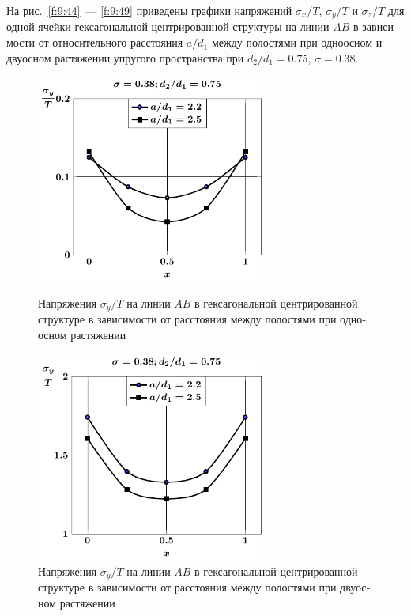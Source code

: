 \begin{russian}
На рис.~\ref{f:9:44}~--- \ref{f:9:49} приведены графики напряжений $\sigma_x/T$, $\sigma_y/T$ и $\sigma_z/T$ для одной ячейки гексагональной центрированной структуры на линии $AB$ в зависимости от относительного расстояния $a/d_1$ между полостями при одноосном и двуосном растяжении упругого пространства при $d_2/d_1=0.75$, $\sigma=0.38$.

\begin{figure}[h!]
\centering\footnotesize
\parbox[b]{7.5cm}{\centering\includegraphics[width=7.5cm]{cav13-a-d75-t1-sig_y.pdf}
\caption{Напряжения $\sigma_y/T$ на линии $AB$ в гексагональной центрированной структуре в зависимости от расстояния между полостями при одноосном растяжении 
\label{f:9:46}}}\hfil\hfil
\parbox[b]{7.5cm}{\centering\includegraphics[width=7.5cm]{cav13-a-d75-t2-sig_y.pdf}
\caption{Напряжения $\sigma_y/T$ на линии $AB$ в гексагональной центрированной структуре в зависимости от расстояния между полостями при двуосном растяжении
\label{f:9:47}}}
\end{figure}


\end{russian}
